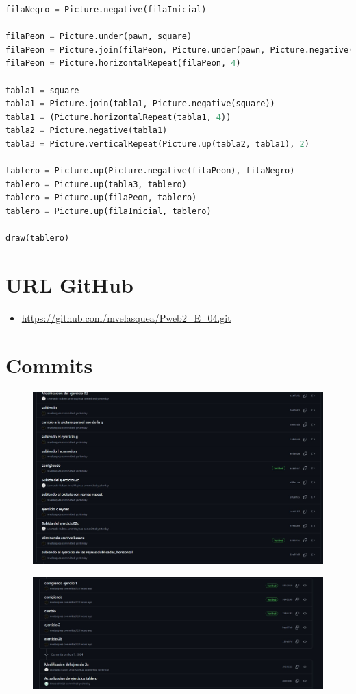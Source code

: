 \documentclass{article}
\begin{document}
\begin{itemize}
\begin{lstlisting}[language=Python, caption={Código completo}, float=H]
filaNegro = Picture.negative(filaInicial)

filaPeon = Picture.under(pawn, square)
filaPeon = Picture.join(filaPeon, Picture.under(pawn, Picture.negative(square)))
filaPeon = Picture.horizontalRepeat(filaPeon, 4)

tabla1 = square
tabla1 = Picture.join(tabla1, Picture.negative(square))
tabla1 = (Picture.horizontalRepeat(tabla1, 4))
tabla2 = Picture.negative(tabla1)
tabla3 = Picture.verticalRepeat(Picture.up(tabla2, tabla1), 2)

tablero = Picture.up(Picture.negative(filaPeon), filaNegro)
tablero = Picture.up(tabla3, tablero)
tablero = Picture.up(filaPeon, tablero)
tablero = Picture.up(filaInicial, tablero)

draw(tablero)
    \end{lstlisting}
\end{itemize}
	\section{URL GitHub }
	\begin{itemize}
		\item \url{https://github.com/mvelasquea/Pweb2_E_04.git}
	\end{itemize}
	\section{Commits }
	\begin{itemize}
		\begin{figure}[H]
			\centering
			\includegraphics[scale=0.3]{img/commits1.jpg}
		\end{figure}
		\begin{figure}[H]
			\centering
			\includegraphics[scale=0.3]{img/commits2.jpg}
		\end{figure}
	\end{itemize}
\end{document}
